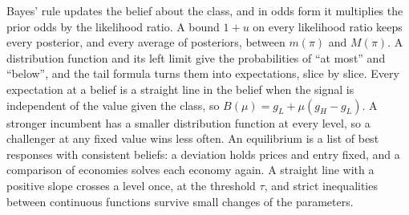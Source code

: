 \begin{chaptersummary}
Bayes' rule updates the belief about the class, and in odds form it multiplies the prior odds by the likelihood
ratio. A bound \(1+u\) on every likelihood ratio keeps every posterior, and every average of posteriors, between
\(m(\pi)\) and \(M(\pi)\). A distribution function and its left limit give the probabilities of ``at most'' and
``below'', and the tail formula turns them into expectations, slice by slice. Every expectation at a belief is a
straight line in the belief when the signal is independent of the value given the class, so
\(B(\mu)=g_L+\mu(g_H-g_L)\). A stronger incumbent has a smaller distribution function at every level, so a
challenger at any fixed value wins less often. An equilibrium is a list of best responses with consistent
beliefs: a deviation holds prices and entry fixed, and a comparison of economies solves each economy again. A
straight line with a positive slope crosses a level once, at the threshold \(\tau\), and strict inequalities between
continuous functions survive small changes of the parameters.
\end{chaptersummary}

\answersection


